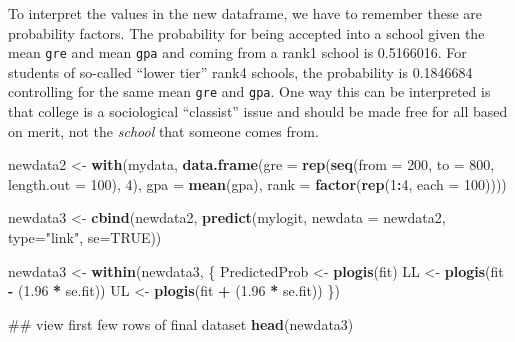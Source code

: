 \documentclass[]{article}
\newenvironment{Shaded}{\begin{snugshade}}{\end{snugshade}}
\newcommand{\KeywordTok}[1]{\textcolor[rgb]{0.13,0.29,0.53}{\textbf{#1}}}
\newcommand{\DataTypeTok}[1]{\textcolor[rgb]{0.13,0.29,0.53}{#1}}
\newcommand{\DecValTok}[1]{\textcolor[rgb]{0.00,0.00,0.81}{#1}}
\newcommand{\FloatTok}[1]{\textcolor[rgb]{0.00,0.00,0.81}{#1}}
\newcommand{\StringTok}[1]{\textcolor[rgb]{0.31,0.60,0.02}{#1}}
\newcommand{\OtherTok}[1]{\textcolor[rgb]{0.56,0.35,0.01}{#1}}
\newcommand{\OperatorTok}[1]{\textcolor[rgb]{0.81,0.36,0.00}{\textbf{#1}}}
\newcommand{\NormalTok}[1]{#1}
\begin{document}
To interpret the values in the new dataframe, we have to remember these
are probability factors. The probability for being accepted into a
school given the mean \texttt{gre} and mean \texttt{gpa} and coming from
a rank1 school is 0.5166016. For students of so-called ``lower tier''
rank4 schools, the probability is 0.1846684 controlling for the same
mean \texttt{gre} and \texttt{gpa}. One way this can be interpreted is
that college is a sociological ``classist'' issue and should be made
free for all based on merit, not the \emph{school} that someone comes
from.

\begin{Shaded}
\begin{Highlighting}[]
\NormalTok{newdata2 <-}\StringTok{ }\KeywordTok{with}\NormalTok{(mydata, }
                 \KeywordTok{data.frame}\NormalTok{(}\DataTypeTok{gre =} \KeywordTok{rep}\NormalTok{(}\KeywordTok{seq}\NormalTok{(}\DataTypeTok{from =} \DecValTok{200}\NormalTok{, }\DataTypeTok{to =} \DecValTok{800}\NormalTok{, }\DataTypeTok{length.out =} \DecValTok{100}\NormalTok{), }\DecValTok{4}\NormalTok{), }
                            \DataTypeTok{gpa =} \KeywordTok{mean}\NormalTok{(gpa), }
                            \DataTypeTok{rank =} \KeywordTok{factor}\NormalTok{(}\KeywordTok{rep}\NormalTok{(}\DecValTok{1}\OperatorTok{:}\DecValTok{4}\NormalTok{, }\DataTypeTok{each =} \DecValTok{100}\NormalTok{))))}
\end{Highlighting}
\end{Shaded}

\begin{Shaded}
\begin{Highlighting}[]
\NormalTok{newdata3 <-}\StringTok{ }\KeywordTok{cbind}\NormalTok{(newdata2, }
                  \KeywordTok{predict}\NormalTok{(mylogit, }
                          \DataTypeTok{newdata =}\NormalTok{ newdata2, }
                          \DataTypeTok{type=}\StringTok{"link"}\NormalTok{, }
                          \DataTypeTok{se=}\OtherTok{TRUE}\NormalTok{)) }

\NormalTok{newdata3 <-}\StringTok{ }\KeywordTok{within}\NormalTok{(newdata3, \{ }
\NormalTok{  PredictedProb <-}\StringTok{ }\KeywordTok{plogis}\NormalTok{(fit) }
\NormalTok{  LL <-}\StringTok{ }\KeywordTok{plogis}\NormalTok{(fit }\OperatorTok{-}\StringTok{ }\NormalTok{(}\FloatTok{1.96} \OperatorTok{*}\StringTok{ }\NormalTok{se.fit)) }
\NormalTok{  UL <-}\StringTok{ }\KeywordTok{plogis}\NormalTok{(fit }\OperatorTok{+}\StringTok{ }\NormalTok{(}\FloatTok{1.96} \OperatorTok{*}\StringTok{ }\NormalTok{se.fit)) \}) }

\NormalTok{## view first few rows of final dataset }
\KeywordTok{head}\NormalTok{(newdata3)}
\end{Highlighting}
\end{Shaded}
\end{document}
